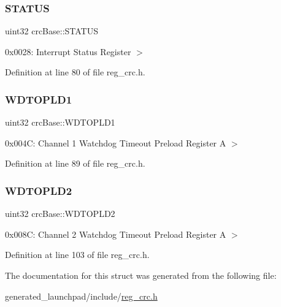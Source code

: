 \subsubsection{\texorpdfstring{S\+T\+A\+T\+US}{STATUS}}
{\footnotesize\ttfamily uint32 crc\+Base\+::\+S\+T\+A\+T\+US}

0x0028\+: Interrupt Status Register $>$ 

Definition at line 80 of file reg\+\_\+crc.\+h.

\mbox{\label{structcrcBase_a2ddcfc8b64176b74dae6f32f0cf2e5e7}} 
\subsubsection{\texorpdfstring{W\+D\+T\+O\+P\+L\+D1}{WDTOPLD1}}
{\footnotesize\ttfamily uint32 crc\+Base\+::\+W\+D\+T\+O\+P\+L\+D1}

0x004C\+: Channel 1 Watchdog Timeout Preload Register A $>$ 

Definition at line 89 of file reg\+\_\+crc.\+h.

\mbox{\label{structcrcBase_ad00315296fe9faf382b5154dbf1ec14c}} 
\subsubsection{\texorpdfstring{W\+D\+T\+O\+P\+L\+D2}{WDTOPLD2}}
{\footnotesize\ttfamily uint32 crc\+Base\+::\+W\+D\+T\+O\+P\+L\+D2}

0x008C\+: Channel 2 Watchdog Timeout Preload Register A $>$ 

Definition at line 103 of file reg\+\_\+crc.\+h.



The documentation for this struct was generated from the following file\+:\begin{DoxyCompactItemize}
\item 
generated\+\_\+launchpad/include/\mbox{\hyperlink{reg__crc_8h}{reg\+\_\+crc.\+h}}\end{DoxyCompactItemize}
